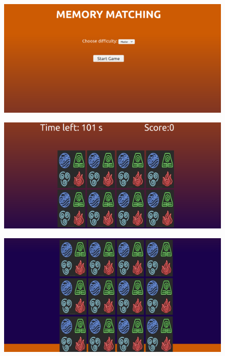 \documentclass[12pt,letterpaper]{article}
\begin{document}
\subsection*{}
\begin{figure}[h]
    \centering
    \includegraphics[width = \textwidth]{MemoryGame/Pics/game1.png}
\end{figure}
\begin{figure}[h]
    \centering
    \includegraphics[width = \textwidth]{MemoryGame/Pics/game2.png}
\end{figure}
\newpage
\begin{figure}[h!]
    \centering
    \includegraphics[width = \textwidth]{MemoryGame/Pics/game3.png}
\end{figure}
\end{document}
